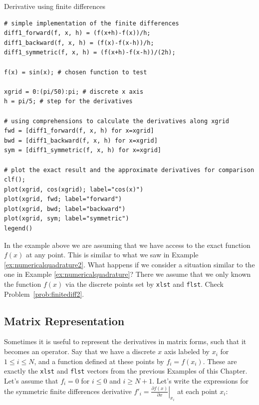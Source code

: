 \begin{example}{Derivative using finite differences}
\label{ex:finitedifferences}
\begin{verbatim}
# simple implementation of the finite differences
diff1_forward(f, x, h) = (f(x+h)-f(x))/h;
diff1_backward(f, x, h) = (f(x)-f(x-h))/h;
diff1_symmetric(f, x, h) = (f(x+h)-f(x-h))/(2h);

f(x) = sin(x); # chosen function to test

xgrid = 0:(pi/50):pi; # discrete x axis
h = pi/5; # step for the derivatives

# using comprehensions to calculate the derivatives along xgrid
fwd = [diff1_forward(f, x, h) for x=xgrid]
bwd = [diff1_backward(f, x, h) for x=xgrid]
sym = [diff1_symmetric(f, x, h) for x=xgrid]

# plot the exact result and the approximate derivatives for comparison
clf();
plot(xgrid, cos(xgrid); label="cos(x)")
plot(xgrid, fwd; label="forward")
plot(xgrid, bwd; label="backward")
plot(xgrid, sym; label="symmetric")
legend()
\end{verbatim}
\end{example}

In the example above we are assuming that we have access to the exact function $f(x)$ at any point. This is similar to what we saw in Example \ref{ex:numericalquadrature2}. What happens if we consider a situation similar to the one in Example \ref{ex:numericalquadrature}? There we assume that we only known the function $f(x)$ via the discrete points set by \texttt{xlst} and \texttt{flst}. Check \mbox{Problem \ref{prob:finitediff2}.}

\subsection{Matrix Representation}
\label{sec:matrixrepresentation}

Sometimes it is useful to represent the derivatives in matrix forms, such that it becomes an operator. Say that we have a discrete $x$ axis labeled by $x_i$ for $1 \leq i \leq N$, and a function defined at these points by $f_i = f(x_i)$. These are exactly the \texttt{xlst} and \texttt{flst} vectors from the previous Examples of this Chapter. Let's assume that $f_i = 0$ for $i \leq 0$ and $i \geq N+1$. Let's write the expressions for the symmetric finite differences derivative $f'_i = \left.\frac{\partial f(x)}{\partial x}\right|_{x_i}$ at each point $x_i$:

